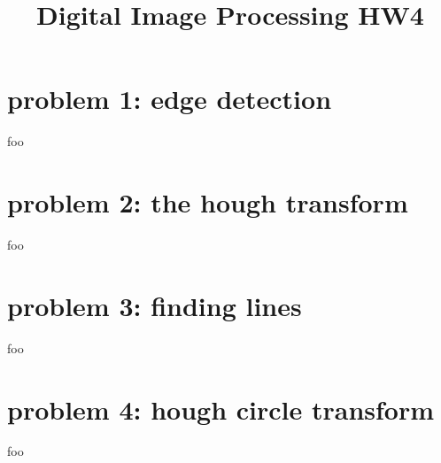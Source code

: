 \documentclass[extendedabs]{bmvc2k}
\begin{document}
\title{Digital Image Processing HW4}

\maketitle
\vspace{-0.2in}

\section*{problem 1: edge detection}

foo

\section*{problem 2: the hough transform}

foo

\section*{problem 3: finding lines}

foo

\section*{problem 4: hough circle transform}

foo
\end{document}
